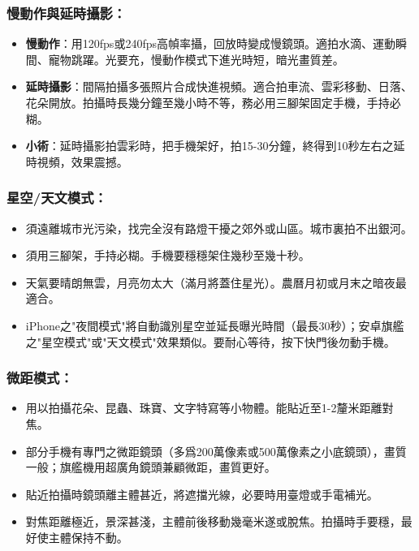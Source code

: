 \subsubsection*{慢動作與延時攝影：}

\begin{itemize}
  \item \textbf{慢動作}：用120fps或240fps高幀率攝，回放時變成慢鏡頭。適拍水滴、運動瞬間、寵物跳躍。光要充，慢動作模式下進光時短，暗光畫質差。
  \item \textbf{延時攝影}：間隔拍攝多張照片合成快進視頻。適合拍車流、雲彩移動、日落、花朵開放。拍攝時長幾分鐘至幾小時不等，務必用三腳架固定手機，手持必糊。
  \item \textbf{小術}：延時攝影拍雲彩時，把手機架好，拍15-30分鐘，終得到10秒左右之延時視頻，效果震撼。
\end{itemize}

\subsubsection*{星空/天文模式：}

\begin{itemize}
  \item 須遠離城市光污染，找完全沒有路燈干擾之郊外或山區。城市裏拍不出銀河。
  \item 須用三腳架，手持必糊。手機要穩穩架住幾秒至幾十秒。
  \item 天氣要晴朗無雲，月亮勿太大（滿月將蓋住星光）。農曆月初或月末之暗夜最適合。
  \item iPhone之"夜間模式"將自動識別星空並延長曝光時間（最長30秒）；安卓旗艦之"星空模式"或"天文模式"效果類似。要耐心等待，按下快門後勿動手機。
\end{itemize}

\subsubsection*{微距模式：}

\begin{itemize}
  \item 用以拍攝花朵、昆蟲、珠寶、文字特寫等小物體。能貼近至1-2釐米距離對焦。
  \item 部分手機有專門之微距鏡頭（多爲200萬像素或500萬像素之小底鏡頭），畫質一般；旗艦機用超廣角鏡頭兼顧微距，畫質更好。
  \item 貼近拍攝時鏡頭離主體甚近，將遮擋光線，必要時用臺燈或手電補光。
  \item 對焦距離極近，景深甚淺，主體前後移動幾毫米遂或脫焦。拍攝時手要穩，最好使主體保持不動。
\end{itemize}

